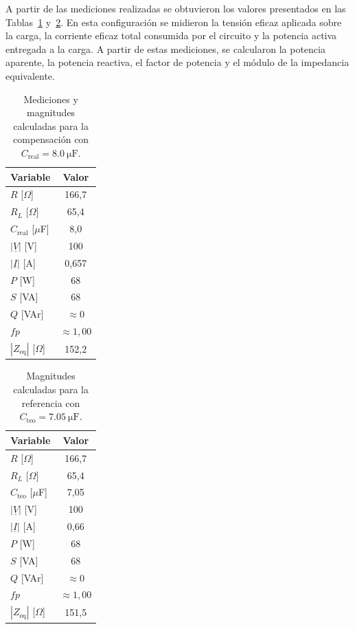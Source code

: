 A partir de las mediciones realizadas se obtuvieron los valores presentados en las Tablas~\ref{tab:tp3_compensacion_real} y~\ref{tab:tp3_compensacion_teorica}. En esta configuración se midieron la tensión eficaz aplicada sobre la carga, la corriente eficaz total consumida por el circuito y la potencia activa entregada a la carga. A partir de estas mediciones, se calcularon la potencia aparente, la potencia reactiva, el factor de potencia y el módulo de la impedancia equivalente.

\begin{table}[H]
    \centering
    \caption{Mediciones y magnitudes calculadas para la compensación con $C_{\text{real}}=\SI{8,0}{\micro\farad}$.}
    \label{tab:tp3_compensacion_real}
    \begin{tabular}{lc}
        \toprule
        Variable & Valor \\
        \midrule
        $R$ [$\Omega$] & 166,7 \\
        $R_L$ [$\Omega$] & 65,4 \\
        $C_{\text{real}}$ [$\mu$F] & 8,0 \\
        $|\underline{V}|$ [V] & 100 \\
        $|\underline{I}|$ [A] & 0,657 \\
        $P$ [W] & 68 \\
        $S$ [VA] & 68 \\
        $Q$ [VAr] & $\approx 0$ \\
        $fp$ & $\approx 1,00$ \\
        $|Z_{\text{eq}}|$ [$\Omega$] & 152,2 \\
        \bottomrule
    \end{tabular}
\end{table}

\begin{table}[H]
    \centering
    \caption{Magnitudes calculadas para la referencia con $C_{\text{teo}}=\SI{7,05}{\micro\farad}$.}
    \label{tab:tp3_compensacion_teorica}
    \begin{tabular}{lc}
        \toprule
        Variable & Valor \\
        \midrule
        $R$ [$\Omega$] & 166,7 \\
        $R_L$ [$\Omega$] & 65,4 \\
        $C_{\text{teo}}$ [$\mu$F] & 7,05 \\
        $|\underline{V}|$ [V] & 100 \\
        $|\underline{I}|$ [A] & 0,66 \\
        $P$ [W] & 68 \\
        $S$ [VA] & 68 \\
        $Q$ [VAr] & $\approx 0$ \\
        $fp$ & $\approx 1,00$ \\
        $|Z_{\text{eq}}|$ [$\Omega$] & 151,5 \\
        \bottomrule
    \end{tabular}
\end{table}
